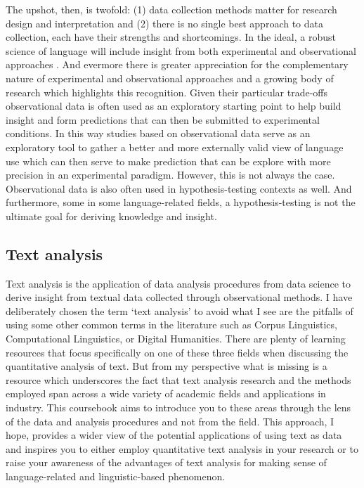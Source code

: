\documentclass[
]{article}
\begin{document}
The upshot, then, is twofold: (1) data collection methods matter for research design and interpretation and (2) there is no single best approach to data collection, each have their strengths and shortcomings. In the ideal, a robust science of language will include insight from both experimental and observational approaches \citep{Gilquin:2009}. And evermore there is greater appreciation for the complementary nature of experimental and observational approaches and a growing body of research which highlights this recognition. Given their particular trade-offs observational data is often used as an exploratory starting point to help build insight and form predictions that can then be submitted to experimental conditions. In this way studies based on observational data serve as an exploratory tool to gather a better and more externally valid view of language use which can then serve to make prediction that can be explore with more precision in an experimental paradigm. However, this is not always the case. Observational data is also often used in hypothesis-testing contexts as well. And furthermore, some in some language-related fields, a hypothesis-testing is not the ultimate goal for deriving knowledge and insight.

\hypertarget{text-analysis}{%
\subsection{Text analysis}\label{text-analysis}}

Text analysis is the application of data analysis procedures from data science to derive insight from textual data collected through observational methods. I have deliberately chosen the term `text analysis' to avoid what I see are the pitfalls of using some other common terms in the literature such as Corpus Linguistics, Computational Linguistics, or Digital Humanities. There are plenty of learning resources that focus specifically on one of these three fields when discussing the quantitative analysis of text. But from my perspective what is missing is a resource which underscores the fact that text analysis research and the methods employed span across a wide variety of academic fields and applications in industry. This coursebook aims to introduce you to these areas through the lens of the data and analysis procedures and not from the field. This approach, I hope, provides a wider view of the potential applications of using text as data and inspires you to either employ quantitative text analysis in your research or to raise your awareness of the advantages of text analysis for making sense of language-related and linguistic-based phenomenon.
\end{document}

